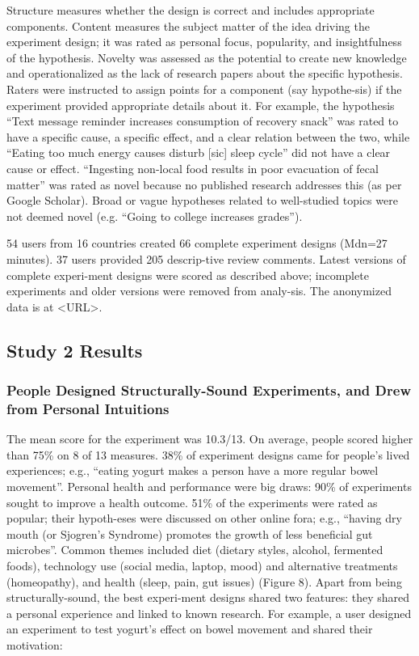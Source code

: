 Structure measures whether the design is correct and includes appropriate components. Content measures the subject matter of the idea driving the experiment design; it was rated as personal focus, popularity, and insightfulness of the hypothesis. Novelty was assessed as the potential to create new knowledge and operationalized as the lack of research papers about the specific hypothesis. Raters were instructed to assign points for a component (say hypothe-sis) if the experiment provided appropriate details about it. For example, the hypothesis “Text message reminder increases consumption of recovery snack” was rated to have a specific cause, a specific effect, and a clear relation between the two, while “Eating too much energy causes disturb [sic] sleep cycle” did not have a clear cause or effect. “Ingesting non-local food results in poor evacuation of fecal matter” was rated as novel because no published research addresses this (as per Google Scholar). Broad or vague hypotheses related to well-studied topics were not deemed novel (e.g. “Going to college increases grades”).

54 users from 16 countries created 66 complete experiment designs (Mdn=27 minutes). 37 users provided 205 descrip-tive review comments. Latest versions of complete experi-ment designs were scored as described above; incomplete experiments and older versions were removed from analy-sis. The anonymized data is at <URL>. 

\subsection{Study 2 Results}
\subsubsection{People Designed Structurally-Sound Experiments, and Drew from Personal Intuitions}
The mean score for the experiment was 10.3/13. On average, people scored higher than 75\% on 8 of 13 measures. 38\% of experiment designs came for people’s lived experiences; e.g., “eating yogurt makes a person have a more regular bowel movement”. Personal health and performance were big draws: 90\% of experiments sought to improve a health outcome. 
51\% of the experiments were rated as popular; their hypoth-eses were discussed on other online fora; e.g., “having dry mouth (or Sjogren's Syndrome) promotes the growth of less beneficial gut microbes”. Common themes included diet (dietary styles, alcohol, fermented foods), technology use (social media, laptop, mood) and alternative treatments (homeopathy), and health (sleep, pain, gut issues) (Figure 8). Apart from being structurally-sound, the best experi-ment designs shared two features: they shared a personal experience and linked to known research. For example, a user designed an experiment to test yogurt’s effect on bowel movement and shared their motivation: 

